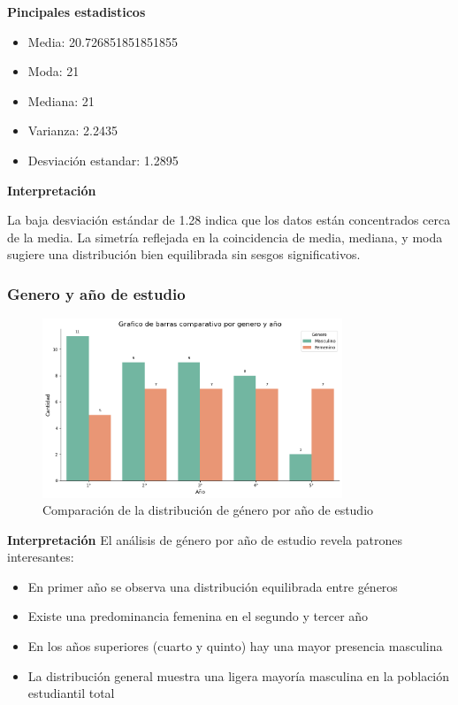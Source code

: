 \documentclass[12pt, a4paper]{article}
\begin{document}
\textbf{Pincipales estadisticos}

\begin{itemize}
    \item Media: 20.726851851851855
    \item Moda: 21
    \item Mediana: 21
    \item Varianza: 2.2435
    
    \item Desviación estandar: 1.2895
\end{itemize}

\textbf{Interpretación}

La baja desviación estándar de 1.28 indica que los datos están concentrados cerca de la media.
La simetría reflejada en la coincidencia de media, mediana, y moda sugiere una distribución bien equilibrada sin sesgos significativos.

\subsubsection{Genero y año de estudio}

\begin{figure}[H]
    \begin{center}
        \includegraphics[width=0.80\textwidth]{images/GeneroPorAño.png}
    \end{center}
    \label{fig:GeneroPorAño}
    \caption{Comparación de la distribución de género por año de estudio}
\end{figure}

\textbf{Interpretación}
El análisis de género por año de estudio revela patrones interesantes:
\begin{itemize}
    \item En primer año se observa una distribución equilibrada entre géneros
    \item Existe una predominancia femenina en el segundo y tercer año
    \item En los años superiores (cuarto y quinto) hay una mayor presencia masculina
    \item La distribución general muestra una ligera mayoría masculina en la población estudiantil total
\end{itemize}
\end{document}
